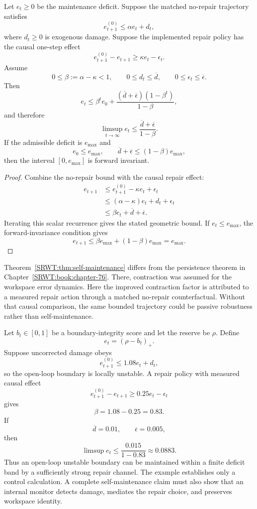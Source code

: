 
\begin{SRWTtheorem}
\label{SRWT:thm:self-maintenance}
Let \(e_t\geq0\) be the maintenance deficit. Suppose the matched no-repair
trajectory satisfies
\[
e_{t+1}^{(0)}
\leq
\alpha e_t+d_t,
\]
where \(d_t\geq0\) is exogenous damage. Suppose the implemented repair policy
has the causal one-step effect
\[
e_{t+1}^{(0)}-e_{t+1}
\geq
\kappa e_t-\epsilon_t.
\]
Assume
\[
0\leq\beta:=\alpha-\kappa<1,
\qquad
0\leq d_t\leq\overline d,
\qquad
0\leq\epsilon_t\leq\overline\epsilon.
\]
Then
\[
\boxed{
e_t
\leq
\beta^te_0
+
\frac{(\overline d+\overline\epsilon)(1-\beta^t)}{1-\beta},
}
\]
and therefore
\[
\boxed{
\limsup_{t\to\infty}e_t
\leq
\frac{\overline d+\overline\epsilon}{1-\beta}.
}
\]
If the admissible deficit is \(e_{\max}\) and
\[
e_0\leq e_{\max},
\qquad
\overline d+\overline\epsilon
\leq
(1-\beta)e_{\max},
\]
then the interval \([0,e_{\max}]\) is forward invariant.
\end{SRWTtheorem}

\begin{proof}
Combine the no-repair bound with the causal repair effect:
\[
\begin{aligned}
e_{t+1}
&\leq
 e_{t+1}^{(0)}-\kappa e_t+\epsilon_t\\
&\leq
(\alpha-\kappa)e_t+d_t+\epsilon_t\\
&\leq
\beta e_t+\overline d+\overline\epsilon.
\end{aligned}
\]
Iterating this scalar recurrence gives the stated geometric bound. If
\(e_t\leq e_{\max}\), the forward-invariance condition gives
\[
e_{t+1}
\leq
\beta e_{\max}
+(1-\beta)e_{\max}
=e_{\max}.
\]
\end{proof}

Theorem~\ref{SRWT:thm:self-maintenance} differs from the persistence theorem in
Chapter~\ref{SRWT:book:chapter-76}. There, contraction was assumed for the workspace error dynamics. Here
the improved contraction factor is attributed to a measured repair action
through a matched no-repair counterfactual. Without that causal comparison,
the same bounded trajectory could be passive robustness rather than
self-maintenance.


Let \(b_t\in[0,1]\) be a boundary-integrity score and let the reserve be
\(\rho\). Define
\[
e_t=(\rho-b_t)_+.
\]
Suppose uncorrected damage obeys
\[
e_{t+1}^{(0)}
\leq
1.08e_t+d_t,
\]
so the open-loop boundary is locally unstable. A repair policy with measured
causal effect
\[
e_{t+1}^{(0)}-e_{t+1}
\geq
0.25e_t-\epsilon_t
\]
gives
\[
\beta=1.08-0.25=0.83.
\]
If
\[
\overline d=0.01,
\qquad
\overline\epsilon=0.005,
\]
then
\[
\limsup e_t
\leq
\frac{0.015}{1-0.83}
\approx0.0883.
\]
Thus an open-loop unstable boundary can be maintained within a finite deficit
band by a sufficiently strong repair channel. The example establishes only a
control calculation. A complete self-maintenance claim must also show that an
internal monitor detects damage, mediates the repair choice, and preserves
workspace identity.

